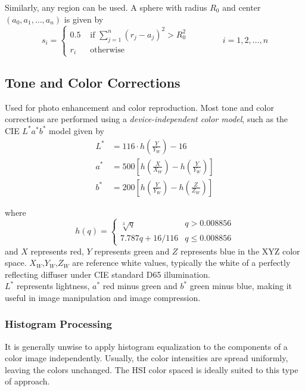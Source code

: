 Similarly, any region can be used. A sphere with radius $R_0$ and center $(a_0,a_1,\dots,a_n)$ is given by
\begin{equation}
	s_i = \begin{cases}
		0.5 & \text{  if } \sum_{j=1}^{n} (r_j - a_j)^2 > R_0^2 \\
		r_i & \text{  otherwise}
	\end{cases} \qquad \qquad i = 1,2,\dots,n
\end{equation}

\subsection{Tone and Color Corrections } 
Used for photo enhancement and color reproduction. Most tone and color corrections are performed using a \textit{device-independent color model}, such as the CIE $L^* a^* b^*$ model given by
\begin{align}
	L^* &= 116 \cdot h(\frac{Y}{Y_W}) - 16 \\
	a^* &= 500 \left[ h(\frac{X}{X_W}) - h(\frac{Y}{Y_W}) \right] \\
	b^* &= 200 \left[ h(\frac{Y}{Y_W}) - h(\frac{Z}{Z_W}) \right]
\end{align}

where
\begin{equation}
	h(q) = \begin{cases}
		\sqrt[3]{q} & q > 0.008856 \\
		7.787q + 16/116 & q \leq 0.008856
	\end{cases}
\end{equation}
and $X$ represents red, $Y$ represents green and $Z$ represents blue in the XYZ color space. $X_W$,$Y_W$,$Z_W$ are reference white values, typically the white of a perfectly reflecting diffuser under CIE standard D65 illumination. \\

$L^*$ represents lightness, $a^*$ red minus green and $b^*$ green minus blue, making it useful in image manipulation and image compression.

\subsubsection{Histogram Processing }
It is generally unwise to apply histogram equalization to the components of a color image independently. Usually, the color intensities are spread uniformly, leaving the colors unchanged. The HSI color spaced is ideally suited to this type of approach.

